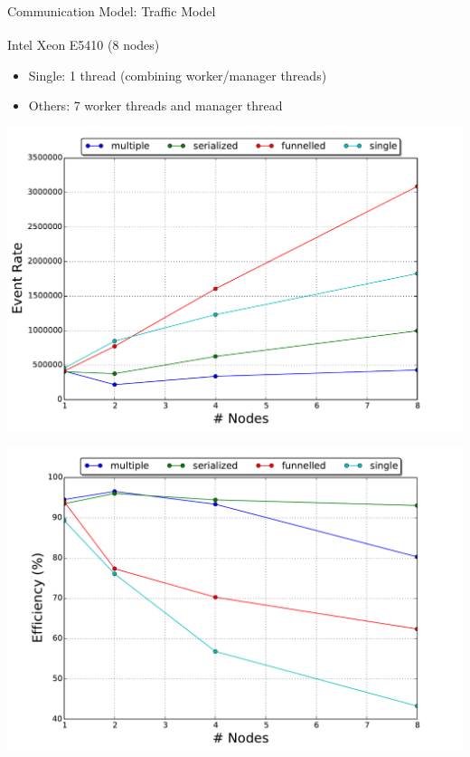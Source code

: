 \documentclass[10pt]{beamer}
\begin{document}
\begin{frame}{Communication Model: Traffic Model}
  \medskip
    \begin{block}{Intel\textsuperscript{\textregistered} Xeon\textsuperscript{\textregistered}
        E5410 (8 nodes)}
      \vspace*{-\medskipamount}
      \begin{footnotesize}
        \begin{itemize}
          \setlength{\itemsep}{-0.025in}
            \item Single: 1 thread (combining worker/manager threads)
            \item Others: 7 worker threads and manager thread
        \end{itemize}
      \end{footnotesize}
      \vspace{-\medskipamount}
        \begin{minipage}{0.55\textwidth}
            \includegraphics[width=\textwidth]{../figs/partitioning_communication/communication_traffic_eventrate.pdf}
        \end{minipage}%
        \begin{minipage}{0.55\textwidth}
            \includegraphics[width=\textwidth]{../figs/partitioning_communication/communication_traffic_efficiency.pdf}

\end{minipage}
\end{block}
\end{frame}
\end{document}
